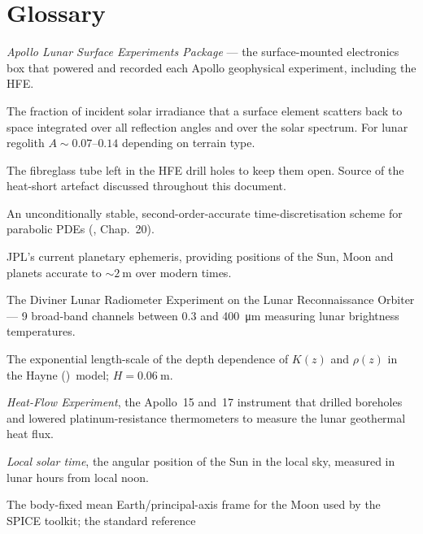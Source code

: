 \documentclass[11pt]{report}
\newcommand{\Hayne}{Hayne (\citeyear{hayne2017})}
\begin{document}
\chapter{Glossary}\label{ch:glossary}

\begin{description}\itemsep2pt
  \item[ALSEP] \emph{Apollo Lunar Surface Experiments Package} ---
        the surface-mounted electronics box that powered and recorded
        each Apollo geophysical experiment, including the HFE.
  \item[Bond albedo $A$] The fraction of incident solar irradiance
        that a surface element scatters back to space integrated over
        all reflection angles and over the solar spectrum. For lunar
        regolith $A\!\sim\!0.07\text{--}0.14$ depending on terrain type.
  \item[Borestem] The fibreglass tube left in the HFE drill holes to
        keep them open. Source of the heat-short artefact discussed
        throughout this document.
  \item[Crank-Nicolson] An unconditionally stable, second-order-accurate
        time-discretisation scheme for parabolic PDEs (\citealt{press2007},
        Chap.~20).
  \item[DE440] JPL's current planetary ephemeris, providing positions of
        the Sun, Moon and planets accurate to $\sim\!\SI{2}{\meter}$ over
        modern times.
  \item[Diviner] The Diviner Lunar Radiometer Experiment on the Lunar
        Reconnaissance Orbiter \citep{paige2010} --- 9 broad-band channels
        between $0.3$ and \SI{400}{\micro\meter} measuring lunar
        brightness temperatures.
  \item[H-parameter ($H$)] The exponential length-scale of the depth
        dependence of $K(z)$ and $\rho(z)$ in the \Hayne\ model;
        $H=\SI{0.06}{\meter}$.
  \item[HFE] \emph{Heat-Flow Experiment}, the Apollo~15 and~17
        instrument that drilled boreholes and lowered platinum-resistance
        thermometers to measure the lunar geothermal heat flux.
  \item[LST] \emph{Local solar time}, the angular position of the Sun
        in the local sky, measured in lunar hours from local noon.
  \item[MOON\_ME] The body-fixed mean Earth/principal-axis frame for
        the Moon used by the SPICE toolkit; the standard reference

\end{description}
\end{document}
